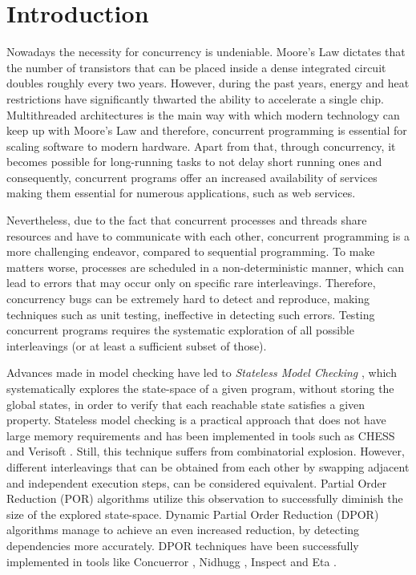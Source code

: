  \chapter{Introduction}

Nowadays the necessity for concurrency is undeniable. 
Moore's Law \cite{4785860} dictates that the number of
transistors that can be placed inside a dense integrated circuit doubles roughly every two years.
However, during the past years, energy and heat restrictions have significantly thwarted the ability 
to accelerate a single chip. Multithreaded architectures
is the main way with which modern technology can keep up with Moore's Law and therefore, concurrent 
programming is essential for scaling software to modern hardware. Apart from that, through concurrency, it becomes possible for 
long-running tasks to not delay short running ones and consequently, concurrent programs offer an increased availability 
of services making them essential for numerous applications, such as web services. 

Nevertheless, due to the fact that concurrent processes and threads share resources and have to communicate with each other,
concurrent programming is a more challenging endeavor, compared to sequential programming. To make matters worse, 
processes are scheduled in a non-deterministic manner, which can lead to errors that may occur only on specific 
rare interleavings. Therefore, concurrency bugs can be extremely hard to detect and reproduce, making techniques such as
unit testing, ineffective in detecting such errors. Testing concurrent programs requires the systematic exploration
of all possible interleavings (or at least a sufficient subset of those).

Advances made in model checking have led to \textit{Stateless Model Checking} \cite{Godefroid:1997:MCP:263699.263717}, 
which systematically explores the state-space of a given program, without storing the global states, in order to verify
that each reachable state satisfies a given property.
Stateless model checking is a practical approach that does not have large memory requirements and has been implemented in
tools such as    CHESS \cite{Musuvathi:2008:FRH:1855741.1855760} and Verisoft \cite{Godefroid:2005:SMC:1084665.1084674}.
Still, this technique suffers from combinatorial explosion. However, different interleavings that can be obtained from each other by
swapping adjacent and independent execution steps, can be considered equivalent.
Partial Order Reduction (POR) \cite{Godefroid1996, POR, 10.1007/3-540-53863-1_36} algorithms utilize this observation to successfully diminish
the size of the explored state-space. Dynamic Partial Order Reduction 
(DPOR) \cite{FlanaganDPOR, AbdullaAronisJohnssonSagonasDPOR2014} algorithms manage to achieve an even increased reduction,
by detecting dependencies more accurately. DPOR techniques have been successfully implemented in tools like Concuerror 
\cite{6569727, Gotovos:2011:TDC:2034654.2034664}, Nidhugg \cite{Abdulla:2015:SMC:2945565.2945622}, Inspect \cite{yang2008inspect}
and Eta \cite{simsa2011efficient}.

